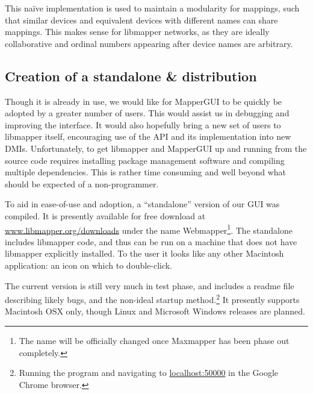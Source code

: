 This na\"ive implementation is used to maintain a modularity for mappings, such that similar devices and equivalent devices with different names can share mappings. This makes sense for libmapper networks, as they are ideally collaborative and ordinal numbers appearing after device names are arbitrary. 
	

	\subsection{Creation of a standalone \& distribution} %
	\label{sec:creation_of_a_standalone_and_distribution}
	
Though it is already in use, we would like for MapperGUI to be quickly be adopted by a greater number of users. This would assist us in debugging and improving the interface. It would also hopefully bring a new set of users to libmapper itself, encouraging use of the API and its implementation into new DMIs. Unfortunately, to get libmapper and MapperGUI up and running from the source code requires installing package management software and compiling multiple dependencies. This is rather time consuming and well beyond what should be expected of a non-programmer. 

To aid in ease-of-use and adoption, a ``standalone'' version of our GUI was compiled. It is presently available for free download at \url{www.libmapper.org/downloads} under the name Webmapper\footnote{The name will be officially changed once Maxmapper has been phase out completely.}. The standalone includes libmapper code, and thus can be run on a machine that does not have libmapper explicitly installed. To the user it looks like any other Macintosh application: an icon on which to double-click.

The current version is still very much in test phase, and includes a readme file describing likely bugs, and the non-ideal startup method.\footnote{Running the program and navigating to \url{localhost:50000} in the Google Chrome browser.} It presently supports Macintosh OSX only, though Linux and Microsoft Windows releases are planned.







